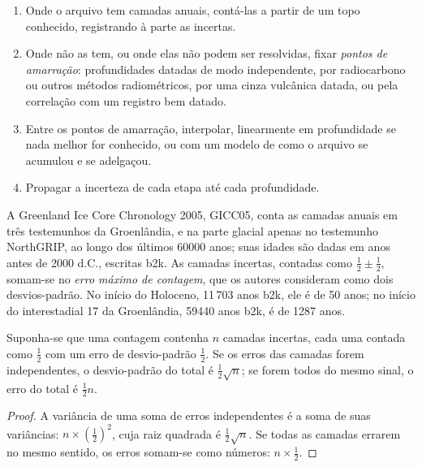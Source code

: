 \begin{method}\label{met:b2:climate-proxies:age-model}
\begin{enumerate}
  \item Onde o arquivo tem camadas anuais, contá-las a partir de um topo conhecido, registrando à parte as
        incertas.
  \item Onde não as tem, ou onde elas não podem ser resolvidas, fixar \emph{pontos de amarração}: profundidades datadas
        de modo independente, por radiocarbono ou outros métodos radiométricos, por uma cinza vulcânica datada, ou pela
        correlação com um registro bem datado.
  \item Entre os pontos de amarração, interpolar, linearmente em profundidade se nada melhor for conhecido, ou com um
        modelo de como o arquivo se acumulou e se adelgaçou.
  \item Propagar a incerteza de cada etapa até cada profundidade.
\end{enumerate}
\end{method}

A Greenland Ice Core Chronology 2005, GICC05, conta as camadas anuais em três testemunhos da Groenlândia, e
na parte glacial apenas no testemunho NorthGRIP, ao longo dos últimos \num{60000} anos; suas idades são
dadas em anos antes de 2000 d.C., escritas b2k. As camadas incertas, contadas como $\frac12 \pm \frac12$,
somam-se no \emph{erro máximo de contagem}, que os autores consideram como dois desvios-padrão.
No início do Holoceno, 11\,703 anos b2k, ele é de 50 anos; no início do
interestadial 17 da Groenlândia, \num{59440} anos b2k, é de \num{1287} anos.

\begin{proposition}\label{prop:b2:climate-proxies:counting}
Suponha-se que uma contagem contenha $n$ camadas incertas, cada uma contada como $\frac12$ com um erro de desvio-padrão
$\frac12$. Se os erros das camadas forem independentes, o desvio-padrão do
total é $\frac12\sqrt{n}$; se forem todos do mesmo sinal, o erro do total é
$\frac12 n$.
\end{proposition}

\begin{proof}
A variância de uma soma de erros independentes é a soma de suas variâncias: $n \times
(\frac12)^2$, cuja raiz quadrada é $\frac12\sqrt{n}$. Se todas as camadas errarem no mesmo sentido, os
erros somam-se como números: $n \times \frac12$.
\end{proof}

